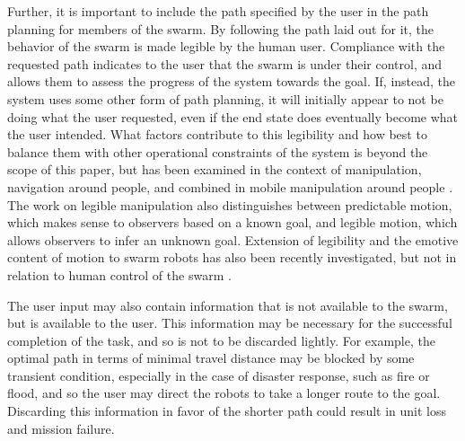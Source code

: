 Further, it is important to include the path specified by the user in the path planning for members of the swarm. 
By following the path laid out for it, the behavior of the swarm is made legible by the human user. 
Compliance with the requested path indicates to the user that the swarm is under their control, and allows them to assess the progress of the system towards the goal. 
If, instead, the system uses some other form of path planning, it will initially appear to not be doing what the user requested, even if the end state does eventually become what the user intended. 
What factors contribute to this legibility and how best to balance them with other operational constraints of the system is beyond the scope of this paper, but has been examined in the context of manipulation, navigation around people, and combined in mobile manipulation around people \citep{dragan2015effects, kruse2013human, beetz2010generality}.
The work on legible manipulation also distinguishes between predictable motion, which makes sense to observers based on a known goal, and legible motion, which allows observers to infer an unknown goal. 
Extension of legibility and the emotive content of motion to swarm robots has also been recently investigated, but not in relation to human control of the swarm \citep{Dietz:2017:HPS:3027063.3053220}.

The user input may also contain information that is not available to the swarm, but is available to the user. 
This information may be necessary for the successful completion of the task, and so is not to be discarded lightly. 
For example, the optimal path in terms of minimal travel distance may be blocked by some transient condition, especially in the case of disaster response, such as fire or flood, and so the user may direct the robots to take a longer route to the goal. 
Discarding this information in favor of the shorter path could result in unit loss and mission failure. 

